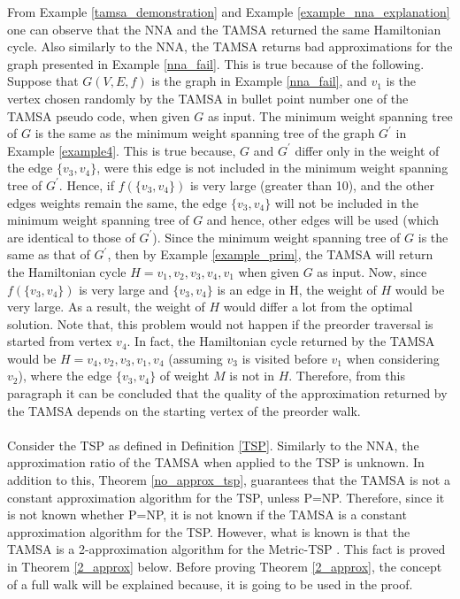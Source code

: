 \documentclass[12pt]{article}
\numberwithin{equation}{subsection}
\numberwithin{table}{subsection}
\begin{document}
From Example \ref{tamsa_demonstration} and Example \ref{example_nna_explanation} one can observe that the NNA and the TAMSA returned the same Hamiltonian cycle. Also similarly to the NNA, the TAMSA returns bad approximations for the graph presented in Example \ref{nna_fail}. This is true because of the following. Suppose that $G(V,E,f)$ is the graph in Example \ref{nna_fail}, and $v_1$ is the vertex chosen randomly by the TAMSA in bullet point number one of the TAMSA pseudo code, when given $G$ as input. The minimum weight spanning tree of $G$ is the same as the minimum weight spanning tree of the graph $G^\prime$ in Example \ref{example4}. This is true because, $G$ and $G^\prime$ differ only in the weight of the edge $\{v_3, v_4\}$, were this edge is not included in the minimum weight spanning tree of $G^\prime$. Hence, if $f(\{v_3, v_4\})$ is very large (greater than 10), and the other edges weights remain the same, the edge $\{v_3, v_4\}$ will not be included in the minimum weight spanning tree of $G$ and hence, other edges will be used (which are identical to those of $G^\prime$). Since the minimum weight spanning tree of $G$ is the same as that of $G^\prime$, then by Example \ref{example_prim}, the TAMSA will return the Hamiltonian cycle $ H = v_1, v_2, v_3, v_4, v_1$ when given $G$ as input. Now, since $f(\{v_3, v_4\})$ is very large and $\{v_3, v_4\}$ is an edge in H, the weight of $H$ would be very large. As a result, the weight of $H$ would differ a lot from the optimal solution. Note that, this problem would not happen if the preorder traversal is started from vertex $v_4$. In fact, the Hamiltonian cycle returned by the TAMSA would be $H = v_4, v_2, v_3, v_1, v_4$ (assuming $v_3$ is visited before $v_1$ when considering $v_2$), where the edge $\{v_3, v_4\}$ of weight $M$ is not in $H$. Therefore, from this paragraph it can be concluded that the quality of the approximation returned by the TAMSA depends on the starting vertex of the preorder walk.\\\\
Consider the TSP as defined in Definition \ref{TSP}. Similarly to the NNA, the approximation ratio of the TAMSA when applied to the TSP is unknown. In addition to this, Theorem \ref{no_approx_tsp}, guarantees that the TAMSA is not a constant approximation algorithm for the TSP, unless P=NP. Therefore, since it is not known whether P=NP, it is not known if the TAMSA is a constant approximation algorithm for the TSP. However, what is known is that the TAMSA is a 2-approximation algorithm for the Metric-TSP \cite{cormen_leiserson_rivest_stein}. This fact is proved in Theorem \ref{2_approx} below. Before proving Theorem \ref{2_approx}, the concept of a full walk will be explained because, it is going to be used in the proof.\\\\
\end{document}
